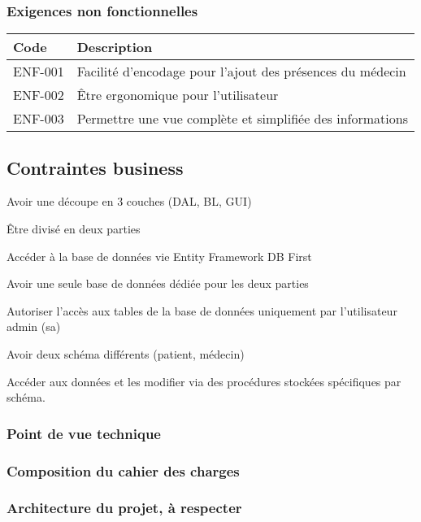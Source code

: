 \documentclass[a4paper,11pt]{article}
\begin{document}
	\subsubsection{Exigences non fonctionnelles}
	
	\begin{table}[ht]
		\begin{tabular}{|m{2.5cm}|m{12.5cm}|}
			\hline
			\textbf{Code} & \textbf{Description} \\ \hline
			ENF-001 & Facilité d'encodage pour l'ajout des présences du médecin \\ \hline
			ENF-002 & Être ergonomique pour l'utilisateur \\ \hline
			ENF-003 & Permettre une vue complète et simplifiée des informations \\ \hline
		\end{tabular}
	\end{table}
	
	\newpage
	
	\subsection{Contraintes business}

	Avoir une découpe en 3 couches (DAL, BL, GUI)
	
	Être divisé en deux parties
	
	Accéder à la base de données vie Entity Framework DB First
	
	Avoir une seule base de données dédiée pour les deux parties
	
	Autoriser l'accès aux tables de la base de données uniquement par l'utilisateur admin (sa)
	
	Avoir deux schéma différents (patient, médecin)
	
	Accéder aux données et les modifier via des procédures stockées spécifiques par schéma.

	\subsubsection{Point de vue technique}
	
	\subsubsection{Composition du cahier des charges}
	
	\subsubsection{Architecture du projet, à respecter}
\end{document}
